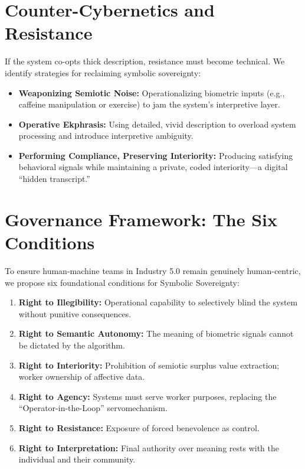 \documentclass[11pt, a4paper]{article}
\begin{document}
\section{Counter-Cybernetics and Resistance}

If the system co-opts thick description, resistance must become technical. We identify strategies for reclaiming symbolic sovereignty:
\begin{itemize}
    \item \textbf{Weaponizing Semiotic Noise:} Operationalizing biometric inputs (e.g., caffeine manipulation or exercise) to jam the system's interpretive layer.
    \item \textbf{Operative Ekphrasis:} Using detailed, vivid description to overload system processing and introduce interpretive ambiguity.
    \item \textbf{Performing Compliance, Preserving Interiority:} Producing satisfying behavioral signals while maintaining a private, coded interiority—a digital ``hidden transcript.''
\end{itemize}

\section{Governance Framework: The Six Conditions}

To ensure human-machine teams in Industry 5.0 remain genuinely human-centric, we propose six foundational conditions for Symbolic Sovereignty:

\begin{enumerate}
    \item \textbf{Right to Illegibility:} Operational capability to selectively blind the system without punitive consequences.
    \item \textbf{Right to Semantic Autonomy:} The meaning of biometric signals cannot be dictated by the algorithm.
    \item \textbf{Right to Interiority:} Prohibition of semiotic surplus value extraction; worker ownership of affective data.
    \item \textbf{Right to Agency:} Systems must serve worker purposes, replacing the ``Operator-in-the-Loop'' servomechanism.
    \item \textbf{Right to Resistance:} Exposure of forced benevolence as control.
    \item \textbf{Right to Interpretation:} Final authority over meaning rests with the individual and their community.
\end{enumerate}
\end{document}
